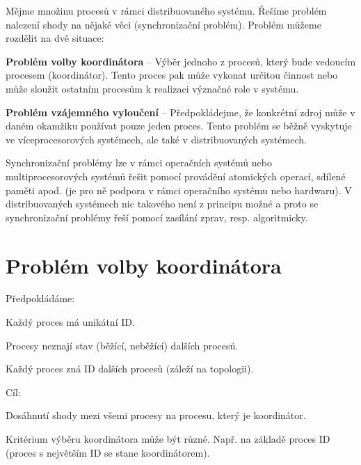 \begin{compactitem}
    \item Mějme množinu procesů v rámci distribuovaného systému. Řešíme problém  nalezení shody na nějaké věci (synchronizační problém). Problém můžeme rozdělit na dvě situace:
    \begin{compactitem}
        \item \textbf{Problém volby koordinátora} -- Výběr jednoho z procesů, který bude vedoucím procesem (koordinátor). Tento proces pak může vykonat určitou činnost nebo může sloužit ostatním procesům k realizaci  význačné role v systému.
        \item \textbf{Problém vzájemného vyloučení} -- Předpokládejme, že konkrétní zdroj může v daném okamžiku používat pouze jeden proces. Tento problém se běžně vyskytuje ve víceprocesorových systémech, ale také v distribuovaných systémech.
    \end{compactitem}
    \item Synchronizační problémy lze v rámci operačních systémů nebo multiprocesorových systémů řešit pomocí provádění atomických operací, sdílené paměti apod. (je pro ně podpora v rámci operačního systému nebo hardwaru). V distribuovaných systémech nic takového není z principu možné a proto se synchronizační problémy řeší pomocí zasílání zprav, resp. algoritmicky.
\end{compactitem}


\section{Problém volby koordinátora}

\begin{compactitem}
    \item Předpokládáme:
    \begin{compactitem}
        \item Každý proces má unikátní ID.
        \item Procesy neznají stav (běžící, neběžící) dalších procesů.
        \item Každý proces zná ID dalších procesů (záleží na topologii).
    \end{compactitem}
    \item Cíl:
    \begin{compactitem}
        \item Dosáhnutí shody mezi všemi procesy na procesu, který je koordinátor.
        \item Kritérium výběru koordinátora může být různé. Např. na základě proces ID (proces s největším ID se stane koordinátorem).
    \end{compactitem}
\end{compactitem}

